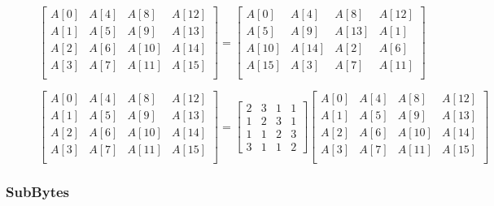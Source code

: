 \documentclass[a4paper,10pt,conference]{IEEEtran}
\begin{document}
\begin{figure}[!t]
\begin{equation}
 \begin{bmatrix}
  A[0] & A[4] & A[8] & A[12] \\
  A[1] & A[5] & A[9] & A[13] \\
  A[2] & A[6] & A[10] & A[14] \\
  A[3] & A[7] & A[11] & A[15] \\
 \end{bmatrix}
 =
 \begin{bmatrix}
  A[0] & A[4] & A[8] & A[12] \\
  A[5] & A[9] & A[13] & A[1] \\
  A[10] & A[14] & A[2] & A[6] \\
  A[15] & A[3] & A[7] & A[11] \\
 \end{bmatrix}
\label{shiftrows}
\end{equation}

\begin{equation}
 \begin{bmatrix}
  A[0] & A[4] & A[8] & A[12] \\
  A[1] & A[5] & A[9] & A[13] \\
  A[2] & A[6] & A[10] & A[14] \\
  A[3] & A[7] & A[11] & A[15] \\
 \end{bmatrix}
 =
 \begin{bmatrix}
  2 & 3 & 1 & 1 \\
  1 & 2 & 3 & 1 \\
  1 & 1 & 2 & 3 \\
  3 & 1 & 1 & 2
 \end{bmatrix}
  \begin{bmatrix}
  A[0] & A[4] & A[8] & A[12] \\
  A[1] & A[5] & A[9] & A[13] \\
  A[2] & A[6] & A[10] & A[14] \\
  A[3] & A[7] & A[11] & A[15] \\
 \end{bmatrix}
 \label{mixcolumns}
\end{equation}

\hrulefill
\vspace*{4pt}
\end{figure}

\subsubsection{SubBytes}
\end{document}
